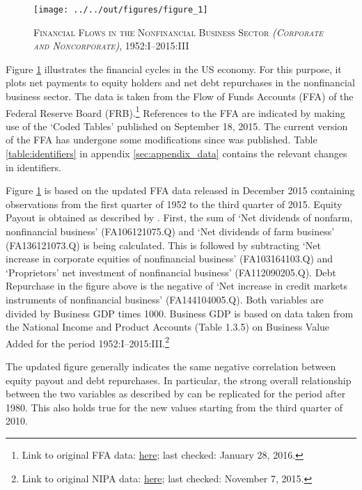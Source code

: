 \begin{figure}[t]
    
    \centering

    \texttt{[image: ../../out/figures/figure\_1]}

    \caption{\textsc{Financial Flows in the Nonfinancial Business Sector \textit{(Corporate and Noncorporate)}}, 1952:I--2015:III}
    
    \label{fig:figure_1}

\end{figure}


Figure \ref{fig:figure_1} illustrates the financial cycles in the US economy. For this purpose, it plots net payments to equity holders and net debt repurchases in the nonfinancial business sector. The data is taken from the Flow of Funds Accounts (FFA) of the Federal Reserve Board (FRB).\footnote{Link to original FFA data: \href{http://www.federalreserve.gov/datadownload/Download.aspx?rel=Z1&series=1f08e962a27dff21b89a7212d58b8346&filetype=spreadsheetml&label=include&layout=seriescolumn&from=03/01/1952&to=09/30/2015}{here}; last checked: January 28, 2016.}
References to the FFA are indicated by making use of the ‘Coded Tables’ published on September 18, 2015. The current version of the FFA has undergone some modifications since \citet{JERMANNfinancial} was published. 
Table \ref{table:identifiers} in appendix \ref{sec:appendix_data} contains the relevant changes in identifiers.

Figure \ref{fig:figure_1} is based on the updated FFA data released in December 2015 containing observations from the first quarter of 1952 to the third quarter of 2015. Equity Payout is obtained as described by \citeauthor{JERMANNfinancial}. First, the sum of ‘Net dividends of nonfarm, nonfinancial business’ (FA106121075.Q) and ‘Net dividends of farm business’ (FA136121073.Q) is being calculated. This is followed by subtracting ‘Net increase in corporate equities of nonfinancial business’ (FA103164103.Q) and ‘Proprietors’ net investment of nonfinancial business’ (FA112090205.Q). Debt Repurchase in the figure above is the negative of ‘Net increase in credit markets instruments of nonfinancial business’ (FA144104005.Q). 
Both variables are divided by Business GDP times 1000. Business GDP is based on data taken from the National Income and Product Accounts (Table 1.3.5) on Business Value Added for the period 1952:I--2015:III.\footnote{Link to original NIPA data: \href{http://www.bea.gov//national/nipaweb/DownSS2.asp}{here}; last checked: November 7, 2015.} 

The updated figure generally indicates the same negative correlation between equity payout and debt repurchases. In particular, the strong overall relationship between the two variables as described by \citeauthor{JERMANNfinancial} can be replicated for the period after 1980. This also holds true for the new values starting from the third quarter of 2010. 

